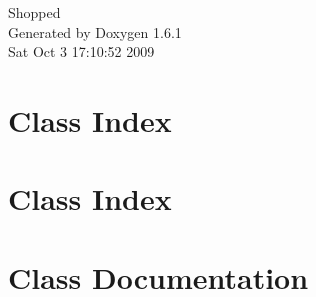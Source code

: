 \documentclass[a4paper]{book}
\begin{document}
\hypersetup{pageanchor=false}
\begin{titlepage}
\vspace*{7cm}
\begin{center}
{\Large Shopped }\\
\vspace*{1cm}
{\large Generated by Doxygen 1.6.1}\\
\vspace*{0.5cm}
{\small Sat Oct 3 17:10:52 2009}\\
\end{center}
\end{titlepage}
\clearemptydoublepage
{}
\tableofcontents
\clearemptydoublepage
{}
\hypersetup{pageanchor=true}
\chapter{Class Index}

\chapter{Class Index}

\chapter{Class Documentation}










\printindex
\end{document}
